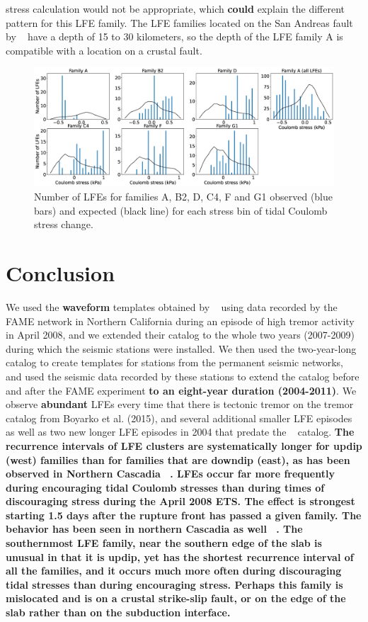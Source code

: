\documentclass[draft]{agujournal2019}
\begin{document}
stress calculation would not be appropriate, which \textbf{could} explain the different pattern for this LFE family. The LFE families located on the San Andreas fault by ~ have a depth of 15 to 30 kilometers, so the depth of the LFE family A is compatible with a location on a crustal fault.

\begin{figure}
\noindent\includegraphics[width=\textwidth, trim={0cm 0cm 0cm 0cm},clip]{figures/coulomb.eps}
\caption{Number of LFEs for families A, B2, D, C4, F and G1 observed (blue bars) and expected (black line) for each stress bin of tidal Coulomb stress change.}
\label{pngfiguresample}
\end{figure}

\section{Conclusion}

We used the \textbf{waveform} templates obtained by ~ using data recorded by the FAME network in Northern California during an episode of high tremor activity in April 2008, and we extended their catalog to the whole two years (2007-2009) during which the seismic stations were installed. We then used the two-year-long catalog to create templates for stations from the permanent seismic networks, and used the seismic data recorded by these stations to extend the catalog before and after the FAME experiment \textbf{to an eight-year duration (2004-2011)}. We observe \textbf{abundant} LFEs every time that there is tectonic tremor on the tremor catalog from Boyarko et al. (2015), and several additional smaller LFE episodes as well as two new longer LFE episodes in 2004 that predate the ~ catalog. \textbf{The recurrence intervals of LFE clusters are systematically longer for updip (west) families than for families that are downdip (east), as has been observed in Northern Cascadia ~\cite{SWE_2019}. LFEs occur far more frequently during encouraging tidal Coulomb stresses than during times of discouraging stress during the April 2008 ETS. The effect is strongest starting 1.5 days after the rupture front has passed a given family. The behavior has been seen in northern Cascadia as well ~\cite{HOU_2015}. The southernmost LFE family, near the southern edge of the slab is unusual in that it is updip, yet has the shortest recurrence interval of all the families, and it occurs much more often during discouraging tidal stresses than during encouraging stress. Perhaps this family is mislocated and is on a crustal strike-slip fault, or on the edge of the slab rather than on the subduction interface.}
\end{document}
